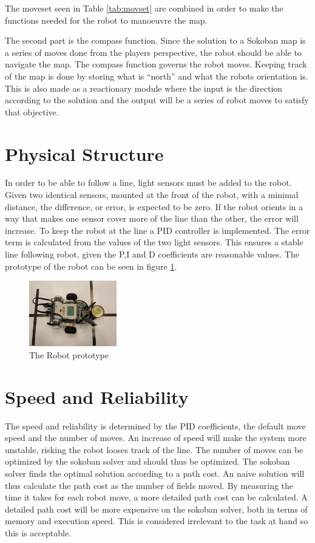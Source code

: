 \documentclass[journal,10pt]{IEEEtran} %
\begin{document}
The moveset seen in Table \ref{tab:movset} are combined in order to make the functions needed for the robot to manoeuvre the map.

The second part is the compass function.
Since the solution to a Sokoban map is a series of moves done from the players perspective, the robot should be able to navigate the map.
The compass function governs the robot moves.
Keeping track of the map is done by storing what is ``north'' and what the robots orientation is.
This is also made as a reactionary module where the input is the direction according to the solution and the output will be a series of robot moves to satisfy that objective.

\section{Physical Structure}
In order to be able to follow a line, light sensors must be added to the robot. 
Given two identical sensors, mounted at the front of the robot, with a minimal distance, the difference, or error, is expected to be zero.
If the robot orients in a way that makes one sensor cover more of the line than the other, the error will increase.
To keep the robot at the line a PID controller is implemented.
The error term is calculated from the values of the two light sensors.
This ensures a stable line following robot, given the P,I and D coefficients are reasonable values.
The prototype of the robot can be seen in figure \ref{fig:robot}.

\begin{figure}
\centering
 \includegraphics[width=0.34\textwidth]{robot}
 \caption{The Robot prototype}\label{fig:robot}
\end{figure}
\section{Speed and Reliability}
The speed and reliability is determined by the PID coefficients, the default move speed and the number of moves.
An increase of speed will make the system more unstable, risking the robot looses track of the line.
The number of moves can be optimized by the sokoban solver and should thus be optimized.
The sokoban solver finds the optimal solution according to a path cost.
An naive solution will thus calculate the path cost as the number of fields moved.
By measuring the time it takes for each robot move, a more detailed path cost can be calculated.
A detailed path cost will be more expensive on the sokoban solver, both in terms of memory and execution speed.
This is considered irrelevant to the task at hand so this is acceptable.
\end{document}
